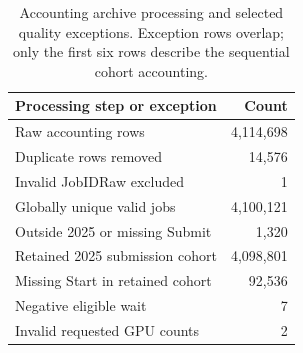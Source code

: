 \begin{table}[htbp]
\centering
\small
\caption[Archive processing and data quality]{Accounting archive processing and selected quality exceptions. Exception rows overlap; only the first six rows describe the sequential cohort accounting.}
\label{tab:table01-data-quality}
\begin{tabular}{lr}
\toprule
Processing step or exception & Count \\
\midrule
Raw accounting rows & 4,114,698 \\
Duplicate rows removed & 14,576 \\
Invalid JobIDRaw excluded & 1 \\
Globally unique valid jobs & 4,100,121 \\
Outside 2025 or missing Submit & 1,320 \\
Retained 2025 submission cohort & 4,098,801 \\
Missing Start in retained cohort & 92,536 \\
Negative eligible wait & 7 \\
Invalid requested GPU counts & 2 \\
\bottomrule
\end{tabular}
\end{table}
